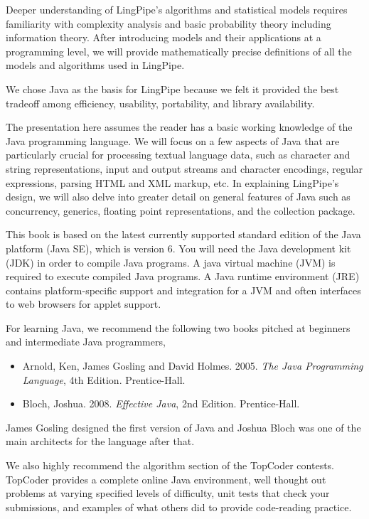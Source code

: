 Deeper understanding of LingPipe's algorithms and statistical models
requires familiarity with complexity analysis and basic probability
theory including information theory.  After introducing models and
their applications at a programming level, we will provide
mathematically precise definitions of all the models and algorithms
used in LingPipe.




\noindent
We chose Java as the basis for LingPipe because we felt it provided
the best tradeoff among efficiency, usability, portability, and
library availability.

The presentation here assumes the reader has a basic working knowledge
of the Java programming language.  We will focus on a few aspects of
Java that are particularly crucial for processing textual language
data, such as character and string representations, input and output
streams and character encodings, regular expressions, parsing HTML and
XML markup, etc.  In explaining LingPipe's design, we will also delve
into greater detail on general features of Java such as concurrency,
generics, floating point representations, and the collection package.


\noindent
This book is based on the latest currently supported standard edition
of the Java platform (Java SE), which is version 6.  You will need the
Java development kit (JDK) in order to compile Java programs.  A java
virtual machine (JVM) is required to execute compiled Java programs.
A Java runtime environment (JRE) contains platform-specific support
and integration for a JVM and often interfaces to web browsers for
applet support.


\noindent
For learning Java, we recommend the following two books pitched at
beginners and intermediate Java programmers,
%
\begin{itemize}
\item Arnold, Ken, James Gosling and David Holmes.  2005.
{\it The Java Programming Language}, 4th Edition.  Prentice-Hall.
\item Bloch, Joshua. 2008. {\it Effective Java}, 2nd Edition.  Prentice-Hall.
\end{itemize}
%
James Gosling designed the first version of Java and Joshua Bloch was
one of the main architects for the language after that.

We also highly recommend the algorithm section of the TopCoder
contests.  TopCoder provides a complete online Java environment, well
thought out problems at varying specified levels of difficulty, unit
tests that check your submissions, and examples of what others did to
provide code-reading practice.
%
\begin{quote}
\end{quote}
%





